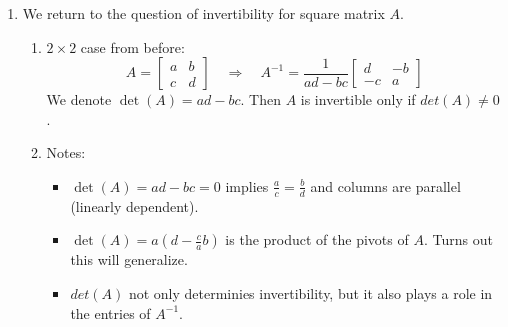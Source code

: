 \documentclass{article}
\begin{document}
\begin{enumerate}

\item We return to the question of invertibility for square matrix $A$. 
\begin{enumerate}
\item $2 \times 2$ case from before:
\[
A = \left[
\begin{array}{cc}
a & b \\
c & d 
\end{array}
\right] \quad \Rightarrow \quad A^{-1}=
\frac{1}{ad-bc} 
\left[
\begin{array}{cc}
d & -b \\
-c & a 
\end{array}
\right]
\]
We denote $\det(A) = ad-bc$. Then $A$ is invertible only if $det(A) \neq 0$.
\item Notes: 
\begin{itemize}
\item $\det(A) = ad-bc=0$ implies $\frac{a}{c}=\frac{b}{d}$ and columns are parallel (linearly dependent).
\item $\det(A) = a(d-\frac{c}{a}b)$ is the product of the pivots of $A$. Turns out this will generalize.
\item $det(A)$ not only determinies invertibility, but it also plays a role in the entries of $A^{-1}$.
\end{itemize}


\end{enumerate}
\end{enumerate}
\end{document}
